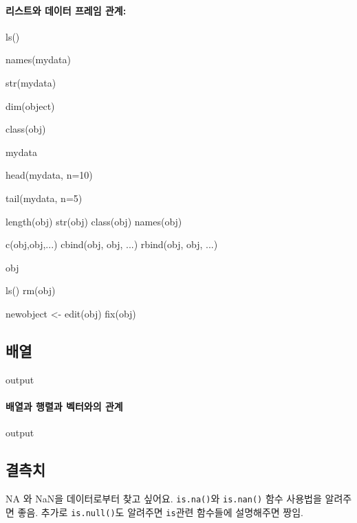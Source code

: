 \documentclass{report}
\begin{document}
\paragraph{리스트와 데이터 프레임 관계:}
	\begin{Schunk}
	\begin{Soutput}
	ls()

	names(mydata)

	str(mydata)


	dim(object)

	class(obj)

	mydata

	head(mydata, n=10)

	tail(mydata, n=5) 

	length(obj)
	str(obj)
	class(obj)
	names(obj)
	
	c(obj,obj,...)
	cbind(obj, obj, ...)
	rbind(obj, obj, ...)
	
	obj
	
	ls()
	rm(obj)
	
	newobject <- edit(obj)
	fix(obj)
	\end{Soutput}
	\end{Schunk}

\subsection{배열}
\begin{Schunk}
\begin{Soutput}
output
\end{Soutput}
\end{Schunk}

\paragraph{배열과 행렬과 벡터와의 관계}

\begin{Schunk}
\begin{Soutput}
output
\end{Soutput}
\end{Schunk}

\subsection{결측치}

NA 와 NaN을 데이터로부터 찾고 싶어요. 
\texttt{is.na()}와 \texttt{is.nan()} 함수 사용법을 알려주면 좋음.  추가로 \texttt{is.null()}도 알려주면 \texttt{is}관련 함수들에 설명해주면 짱임.
\end{document}
